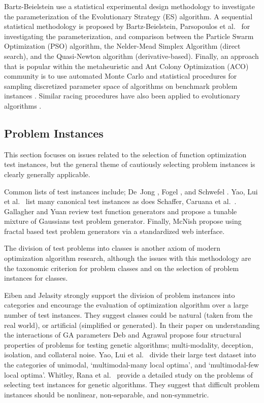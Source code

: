 Bartz-Beielstein \cite{Bartz-Beielstein2003} use a statistical experimental design methodology to investigate the parameterization of the Evolutionary Strategy (ES) algorithm. A sequential statistical methodology is proposed by Bartz-Beielstein, Parsopoulos et al.\ \cite{Bartz-Beielstein2004} for investigating the parameterization, and comparison between the Particle Swarm Optimization (PSO) algorithm, the Nelder-Mead Simplex Algorithm (direct search), and the Quasi-Newton algorithm (derivative-based). Finally, an approach that is popular within the metaheuristic and Ant Colony Optimization (ACO) community is to use automated Monte Carlo and statistical procedures for sampling discretized parameter space of algorithms on benchmark problem instances \cite{Birattari2002}. Similar racing procedures have also been applied to evolutionary algorithms \cite{Yuan2004}.

% 
% 
\subsection{Problem Instances}
This section focuses on issues related to the selection of function optimization test instances, but the general theme of cautiously selecting problem instances is clearly generally applicable.

Common lists of test instances include; De~Jong \cite{Jong1975}, Fogel \cite{Fogel1995}, and Schwefel \cite{Schwefel1995}. Yao, Lui et al.\ \cite{Yao1999} list many canonical test instances as does Schaffer, Caruana et al.\ \cite{Schaffer1989}. Gallagher and Yuan \cite{Gallagher2006} review test function generators and propose a tunable mixture of Gaussians test problem generator. Finally, McNish \cite{MacNish2005} propose using fractal based test problem generators via a standardized web interface.

The division of test problems into classes is another axiom of modern optimization algorithm research, although the issues with this methodology are the taxonomic criterion for problem classes and on the selection of problem instances for classes.

Eiben and Jelasity \cite{Eiben2002} strongly support the division of problem instances into categories and encourage the evaluation of optimization algorithm over a large number of test instances. They suggest classes could be natural (taken from the real world), or artificial (simplified or generated). In their paper on understanding the interactions of GA parameters Deb and Agrawal \cite{Deb1999} propose four structural properties of problems for testing genetic algorithms; multi-modality, deception, isolation, and collateral noise. Yao, Lui et al.\ \cite{Yao1999} divide their large test dataset into the categories of unimodal,	`multimodal-many	local	optima',	and `multimodal-few local optima'. Whitley, Rana et al.\ \cite{Whitley1996} provide a detailed study on the problems of selecting test instances for genetic algorithms. They suggest that difficult problem instances should be nonlinear, non-separable, and non-symmetric.

